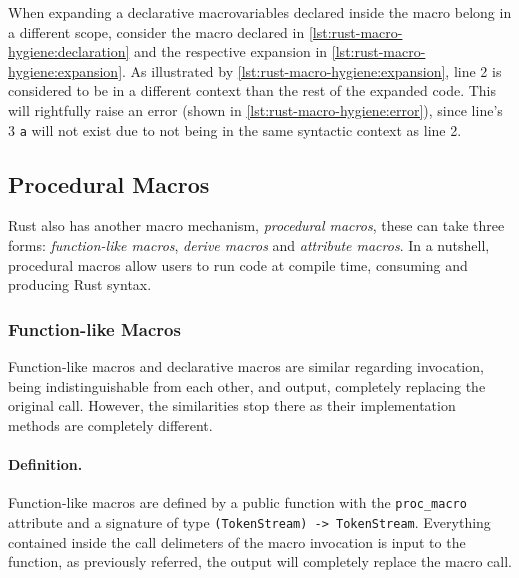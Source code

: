 When expanding a declarative macro\footnotemark variables declared inside the macro belong in a different scope,
consider the macro declared in \autoref{lst:rust-macro-hygiene:declaration} and
the respective expansion in \autoref{lst:rust-macro-hygiene:expansion}.
As illustrated by \autoref{lst:rust-macro-hygiene:expansion},
line 2 is considered to be in a different context than the rest of the expanded code.
This will rightfully raise an error (shown in \autoref{lst:rust-macro-hygiene:error}),
since line's 3 \texttt{a} will not exist due to not being in the same syntactic context as line 2.











\subsection{Procedural Macros}\label{sec:rust-macros:proc}
Rust also has another macro mechanism, \emph{procedural macros},
these can take three forms: \emph{function-like macros}, \emph{derive macros} and \emph{attribute macros}.
In a nutshell, procedural macros allow users to run code at compile time, consuming and producing Rust syntax.

\subsubsection*{Function-like Macros}
Function-like macros and declarative macros are similar regarding invocation, being indistinguishable from each other,
and output, completely replacing the original call.
However, the similarities stop there as their implementation methods are completely different.

\paragraph{Definition.}
Function-like macros are defined by a public function with the \texttt{proc\_macro} attribute and
a signature of type \texttt{(TokenStream) -> TokenStream}.
Everything contained inside the call delimeters of the macro invocation is input to the function,
as previously referred, the output will completely replace the macro call.

